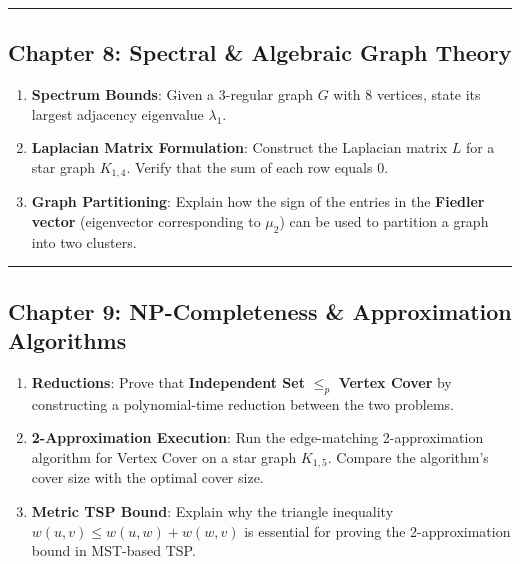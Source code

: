 \documentclass[
]{book}
\providecommand{\tightlist}{%
  \setlength{\itemsep}{0pt}\setlength{\parskip}{0pt}}
\theoremstyle{definition}
\theoremstyle{definition}
\theoremstyle{definition}
\theoremstyle{definition}
\theoremstyle{remark}
\begin{document}
\begin{center}\rule{0.5\linewidth}{0.5pt}\end{center}

\subsection{Chapter 8: Spectral \& Algebraic Graph Theory}\label{chapter-8-spectral-algebraic-graph-theory-1}

\begin{enumerate}
\def\labelenumi{\arabic{enumi}.}
\tightlist
\item
  \textbf{Spectrum Bounds}: Given a 3-regular graph \(G\) with 8 vertices, state its largest adjacency eigenvalue \(\lambda_1\).
\item
  \textbf{Laplacian Matrix Formulation}: Construct the Laplacian matrix \(L\) for a star graph \(K_{1,4}\). Verify that the sum of each row equals 0.
\item
  \textbf{Graph Partitioning}: Explain how the sign of the entries in the \textbf{Fiedler vector} (eigenvector corresponding to \(\mu_2\)) can be used to partition a graph into two clusters.
\end{enumerate}

\begin{center}\rule{0.5\linewidth}{0.5pt}\end{center}

\subsection{Chapter 9: NP-Completeness \& Approximation Algorithms}\label{chapter-9-np-completeness-approximation-algorithms-1}

\begin{enumerate}
\def\labelenumi{\arabic{enumi}.}
\tightlist
\item
  \textbf{Reductions}: Prove that \textbf{Independent Set} \(\le_p\) \textbf{Vertex Cover} by constructing a polynomial-time reduction between the two problems.
\item
  \textbf{2-Approximation Execution}: Run the edge-matching 2-approximation algorithm for Vertex Cover on a star graph \(K_{1,5}\). Compare the algorithm's cover size with the optimal cover size.
\item
  \textbf{Metric TSP Bound}: Explain why the triangle inequality \(w(u, v) \le w(u, w) + w(w, v)\) is essential for proving the 2-approximation bound in MST-based TSP.
\end{enumerate}
\end{document}
